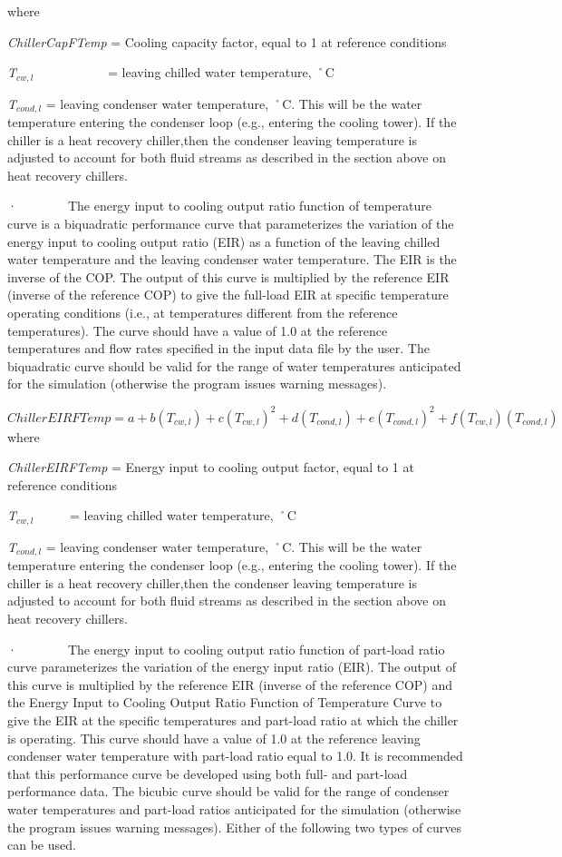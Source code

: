 where

\emph{ChillerCapFTemp} = Cooling capacity factor, equal to 1 at reference conditions

\emph{T\(_{cw,l}\)}~~~~~~~~~~~ = leaving chilled water temperature, ˚C

\emph{T\(_{cond,l}\)} = leaving condenser water temperature, ˚C. This will be the water temperature entering the condenser loop (e.g., entering the cooling tower). If the chiller is a heat recovery chiller,then the condenser leaving temperature is adjusted to account for both fluid streams as described in the section above on heat recovery chillers.

·~~~~~~~~The energy input to cooling output ratio function of temperature curve is a biquadratic performance curve that parameterizes the variation of the energy input to cooling output ratio (EIR) as a function of the leaving chilled water temperature and the leaving condenser water temperature. The EIR is the inverse of the COP. The output of this curve is multiplied by the reference EIR (inverse of the reference COP) to give the full-load EIR at specific temperature operating conditions (i.e., at temperatures different from the reference temperatures). The curve should have a value of 1.0 at the reference temperatures and flow rates specified in the input data file by the user. The biquadratic curve should be valid for the range of water temperatures anticipated for the simulation (otherwise the program issues warning messages).

\(ChillerEIRFTemp = a + b({T_{cw,l}}) + c{({T_{cw,l}})^2} + d({T_{cond,l}}) + e{({T_{cond,l}})^2} + f({T_{cw,l}})({T_{cond,l}})\) where

\emph{ChillerEIRFTemp} = Energy input to cooling output factor, equal to 1 at reference conditions

\emph{T\(_{cw,l}\)}~~~~~ = leaving chilled water temperature, ˚C

\emph{T\(_{cond,l}\)} = leaving condenser water temperature, ˚C. This will be the water temperature entering the condenser loop (e.g., entering the cooling tower). If the chiller is a heat recovery chiller,then the condenser leaving temperature is adjusted to account for both fluid streams as described in the section above on heat recovery chillers.

·~~~~~~~~The energy input to cooling output ratio function of part-load ratio curve parameterizes the variation of the energy input ratio (EIR). The output of this curve is multiplied by the reference EIR (inverse of the reference COP) and the Energy Input to Cooling Output Ratio Function of Temperature Curve to give the EIR at the specific temperatures and part-load ratio at which the chiller is operating. This curve should have a value of 1.0 at the reference leaving condenser water temperature with part-load ratio equal to 1.0. It is recommended that this performance curve be developed using both full- and part-load performance data. The bicubic curve should be valid for the range of condenser water temperatures and part-load ratios anticipated for the simulation (otherwise the program issues warning messages). Either of the following two types of curves can be used.

